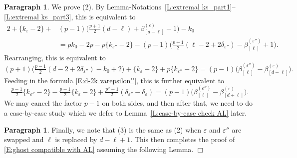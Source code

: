 \documentclass[12pt]{amsart}
\theoremstyle{definition}
\newtheorem{para}[subsection]{Paragraph}
\numberwithin{equation}{subsection}
\begin{document}
\begin{para}
\label{P:para_141}
We prove (2). By Lemma-Notations~\ref{L:extremal ks_part1}--\ref{L:extremal ks_part3}, this is equivalent to
\begin{align*}
2 +\{k_{\varepsilon} -2\} + &(p-1) \big(\tfrac{p+1}2 (d-\ell) +\beta_{[d-\ell]}^{(\varepsilon)}-1\big) - k_0
\\
& = pk_0 - 
2p -p\{k_{\varepsilon''} -2\} - (p-1) \big(\tfrac{p+1}2 (\ell-2+2\delta_{\varepsilon''}) -\beta_{[\ell]}^{(\varepsilon'')}+1\big) .
\end{align*}
Rearranging, this is equivalent to
$$
(p+1) \big( \tfrac{p-1}2 (d-2+2\delta_{\varepsilon''})-k_0 + 2\big) + \{k_\varepsilon - 2\} +p\{k_{\varepsilon''}-2\} = (p-1)\big( \beta_{[\ell]}^{(\varepsilon'')}- \beta_{[d-\ell]}^{(\varepsilon)}\big).
$$
Feeding in the formula \eqref{E:d-2k varepsilon''}, this is further equivalent to
$$
\tfrac{p-1}2\{k_{\varepsilon''} - 2\}-\tfrac{p-1}2\{k_\varepsilon-2\} + \tfrac{p^2-1}2(\delta_{\varepsilon''} - \delta_\varepsilon) =  (p-1)\big( \beta_{[\ell]}^{(\varepsilon'')}- \beta_{[d+\ell]}^{(\varepsilon)}\big).
$$
We may cancel the factor $p-1$ on both sides, and then after that, we need to do a case-by-case study which we defer to Lemma~\ref{L:case-by-case check AL} later.
\end{para}

\begin{para}
\label{P:para_142}
Finally, we note that (3) is the same as (2) when $\varepsilon$ and $\varepsilon''$ are swapped and $\ell$ is replaced by $d-\ell + 1$.
This then completes the proof of \eqref{E:ghost compatible with AL} assuming the following Lemma.
 \hfill $\Box$
\end{para}
\end{document}
